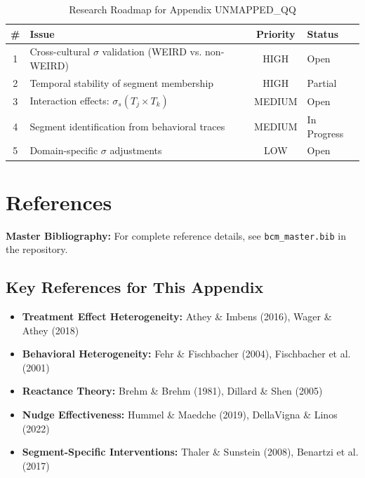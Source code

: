 \begin{table}[htbp]
\centering
\caption{Research Roadmap for Appendix UNMAPPED_QQ}
\label{tab:qq-roadmap}
\renewcommand{\arraystretch}{1.3}
\begin{tabular}{@{}clcl@{}}
\toprule
\textbf{\#} & \textbf{Issue} & \textbf{Priority} & \textbf{Status} \\
\midrule
1 & Cross-cultural $\sigma$ validation (WEIRD vs. non-WEIRD) & HIGH & Open \\
2 & Temporal stability of segment membership & HIGH & Partial \\
3 & Interaction effects: $\sigma_{s}(T_j \times T_k)$ & MEDIUM & Open \\
4 & Segment identification from behavioral traces & MEDIUM & In Progress \\
5 & Domain-specific $\sigma$ adjustments & LOW & Open \\
\bottomrule
\end{tabular}
\end{table}


\section{References}
\label{sec:qq-references}

\begin{tcolorbox}[colback=blue!5!white, colframe=blue!75!black]
\textbf{Master Bibliography:} For complete reference details, see
\texttt{bcm\_master.bib} in the repository.
\end{tcolorbox}

\vspace{0.5em}

\subsection{Key References for This Appendix}

\begin{itemize}[nosep]
    \item \textbf{Treatment Effect Heterogeneity:} Athey \& Imbens (2016), Wager \& Athey (2018)
    \item \textbf{Behavioral Heterogeneity:} Fehr \& Fischbacher (2004), Fischbacher et al. (2001)
    \item \textbf{Reactance Theory:} Brehm \& Brehm (1981), Dillard \& Shen (2005)
    \item \textbf{Nudge Effectiveness:} Hummel \& Maedche (2019), DellaVigna \& Linos (2022)
    \item \textbf{Segment-Specific Interventions:} Thaler \& Sunstein (2008), Benartzi et al. (2017)
\end{itemize}



